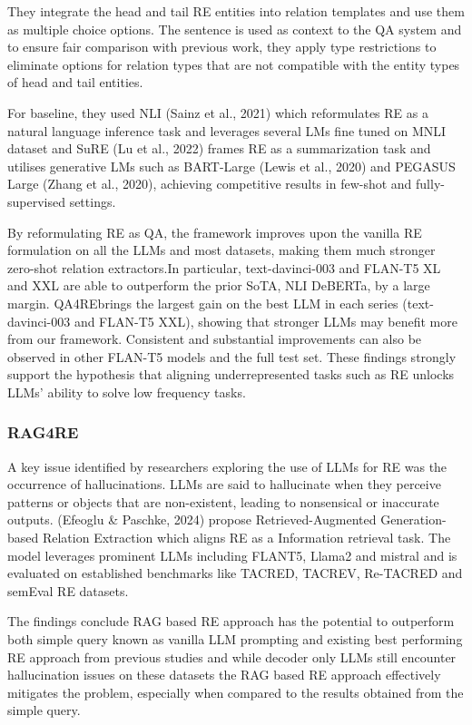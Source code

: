\documentclass[twocolumn, 11pt]{extarticle}
\begin{document}
They integrate the head and tail RE entities into relation templates and use them as multiple choice options. The sentence is used as context to the QA system and to ensure fair comparison with previous work, they apply type restrictions to eliminate options for relation types that are not compatible with the entity types of head and tail entities. 

For baseline, they used  NLI (Sainz et al., 2021) which reformulates RE as a natural language inference task and leverages several LMs fine tuned on MNLI dataset and
SuRE (Lu et al., 2022) frames RE as a summarization task and utilises generative LMs such as BART-Large (Lewis et al., 2020) and PEGASUS Large (Zhang et al., 2020), achieving competitive results in few-shot and fully-supervised settings.

By reformulating RE as QA, the framework improves upon the vanilla RE formulation on all the LLMs and most datasets, making them much stronger zero-shot relation extractors.In particular, text-davinci-003 and FLAN-T5 XL and XXL are able to outperform the prior SoTA, NLI DeBERTa, by a large margin. QA4REbrings the largest gain on the best LLM in each series (text-davinci-003 and FLAN-T5 XXL), showing that stronger LLMs may benefit more from our framework. Consistent and substantial improvements can also be observed in other FLAN-T5 models and the full test set. These findings strongly support the hypothesis that aligning underrepresented tasks such as RE unlocks LLMs’ ability to solve low frequency tasks.

\subsubsection{RAG4RE}
A key issue identified by researchers exploring the use of LLMs for RE was the occurrence of hallucinations. LLMs are said to hallucinate when they perceive patterns or objects that are non-existent, leading to nonsensical or inaccurate outputs. (Efeoglu \& Paschke, 2024) propose Retrieved-Augmented Generation-based Relation Extraction which aligns RE as a Information retrieval task. The model leverages prominent LLMs including FLANT5, Llama2 and mistral and is evaluated on established benchmarks like TACRED, TACREV, Re-TACRED and semEval RE datasets.  

The findings conclude RAG based RE approach has the potential to outperform both simple query known as vanilla LLM prompting and existing best performing RE approach from previous studies and while decoder only LLMs still encounter hallucination issues on these datasets the RAG based RE approach effectively mitigates the problem, especially when compared to the results obtained from the simple query. 
\end{document}
